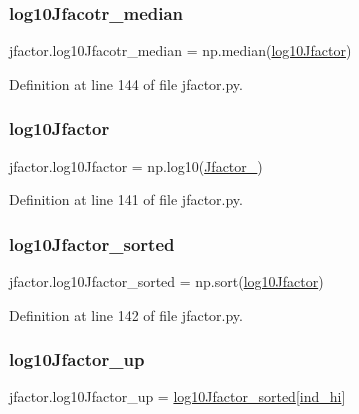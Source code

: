 \subsubsection{\texorpdfstring{log10\+Jfacotr\+\_\+median}{log10Jfacotr\_median}}
{\footnotesize\ttfamily jfactor.\+log10\+Jfacotr\+\_\+median = np.\+median(\hyperlink{namespacejfactor_a9a89658d06c0c77e0c11e4372ef88f4f}{log10\+Jfactor})}



Definition at line 144 of file jfactor.\+py.

\mbox{\label{namespacejfactor_a9a89658d06c0c77e0c11e4372ef88f4f}} 
\subsubsection{\texorpdfstring{log10\+Jfactor}{log10Jfactor}}
{\footnotesize\ttfamily jfactor.\+log10\+Jfactor = np.\+log10(\hyperlink{namespacejfactor_adfab35ee4763d30c17fe3a8791394e44}{Jfactor\+\_\+})}



Definition at line 141 of file jfactor.\+py.

\mbox{\label{namespacejfactor_a81a38976b26f5865c633d0d078ab7796}} 
\subsubsection{\texorpdfstring{log10\+Jfactor\+\_\+sorted}{log10Jfactor\_sorted}}
{\footnotesize\ttfamily jfactor.\+log10\+Jfactor\+\_\+sorted = np.\+sort(\hyperlink{namespacejfactor_a9a89658d06c0c77e0c11e4372ef88f4f}{log10\+Jfactor})}



Definition at line 142 of file jfactor.\+py.

\mbox{\label{namespacejfactor_a17eab489ecdc2fcda0ff105b820f38a4}} 
\subsubsection{\texorpdfstring{log10\+Jfactor\+\_\+up}{log10Jfactor\_up}}
{\footnotesize\ttfamily jfactor.\+log10\+Jfactor\+\_\+up = \hyperlink{namespacejfactor_a81a38976b26f5865c633d0d078ab7796}{log10\+Jfactor\+\_\+sorted}\mbox{[}\hyperlink{namespacejfactor_a449b6d5eec9600e32c2388268c367957}{ind\+\_\+hi}\mbox{]}}



